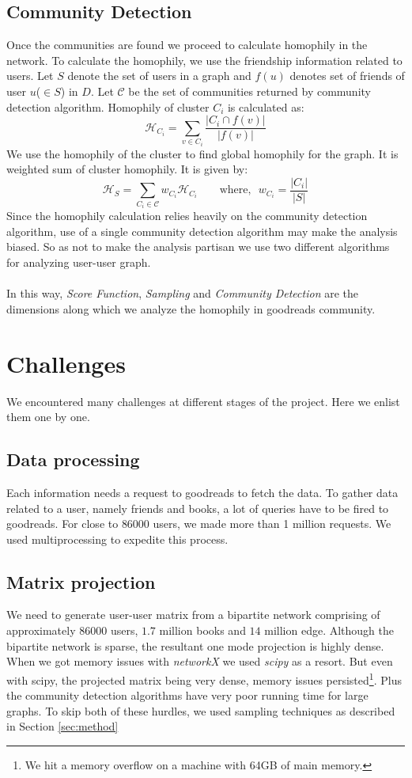 \documentclass[11pt]{article}
\begin{document}
\subsection{Community Detection}
Once the communities are found we proceed to calculate homophily in the network. To calculate the homophily, we use the friendship information related to users. Let $S$ denote the set of users in a graph and $f(u)$ denotes set of friends of user $u$($\in S$) in $D$. Let $\mathcal{C}$ be the set of communities returned by community detection algorithm. Homophily of cluster $C_i$ is calculated as:
\[
\mathcal{H}_{C_i} = \sum_{v \in C_i} \frac{|C_i \cap f(v)|}{|f(v)|}
\]
We use the homophily of the cluster to find global homophily for the graph. It is weighted sum of cluster homophily. It is given by:
\[
\mathcal{H}_{S} = \sum_{C_i \in \mathcal{C}} w_{C_i} \mathcal{H}_{C_i} ~~~~~~~~~\textrm{where,}~~~w_{C_i} = \frac{|C_i|}{|S|}
\]
Since the homophily calculation relies heavily on the community detection algorithm, use of a single community detection algorithm may make the analysis biased. So as not to make the analysis partisan we use two different algorithms for analyzing user-user graph.\\\\
In this way, {\it Score Function}, {\it Sampling} and {\it Community Detection} are the dimensions along which we analyze the homophily in goodreads community.

\section{Challenges}
We encountered many challenges at different stages of the project. Here we enlist them one by one.

\subsection{Data processing}
Each information needs a request to goodreads to fetch the data. To gather data related to a user, namely friends and books, a lot of queries have to be fired to goodreads. For close to $86000$ users, we made more than 1 million requests. We used multiprocessing to expedite this process.

\subsection{Matrix projection}
We need to generate user-user matrix from a bipartite network comprising of approximately $86000$ users, $1.7$ million books and $14$ million edge. Although the bipartite network is sparse, the resultant one mode projection is highly dense. When we got memory issues with {\it networkX} we used {\it scipy} as a resort. But even with scipy, the projected matrix being very dense, memory issues persisted\footnote{ We hit a memory overflow on a machine with 64GB of main memory.}. Plus the community detection algorithms have very poor running time for large graphs. To skip both of these hurdles, we used sampling techniques as described in Section \ref{sec:method}
\end{document}
